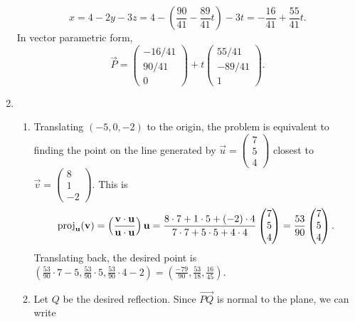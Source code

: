 \begin{enumerate}
\begin{equation*}
x = 4 - 2y - 3z =  4 - \left(\frac{90}{41} - \frac{89}{41}t\right) - 3t = -\frac{16}{41} + \frac{55}{41}t.
\end{equation*}
In vector parametric form,
\begin{equation*}
\overrightarrow{P} = \begin{pmatrix} -16/41 \\ 90/41 \\ 0 \end{pmatrix} + t\begin{pmatrix} 55/41 \\ -89/41 \\ 1 \end{pmatrix}.
\end{equation*}
\newpage
\item \begin{enumerate}
\item Translating $(-5,0,-2)$ to the origin, the problem is equivalent to finding the point on the line generated by $\vec{u} = \begin{pmatrix} 7 \\ 5 \\ 4 \end{pmatrix}$ closest to $\vec{v} = \begin{pmatrix} 8 \\ 1 \\ -2 \end{pmatrix}$. This is
\begin{equation*}
\operatorname{proj}_{\mathbf{u}}(\mathbf{v}) = \left(\frac{\mathbf{v}\cdot\mathbf{u}}{\mathbf{u}\cdot\mathbf{u}}\right)\mathbf{u} = \frac{8\cdot 7 + 1\cdot 5 + (-2)\cdot 4}{7\cdot 7 + 5\cdot 5 + 4\cdot 4}\begin{pmatrix} 7 \\ 5 \\ 4 \end{pmatrix} = \frac{53}{90}\begin{pmatrix} 7 \\ 5 \\ 4 \end{pmatrix}.
\end{equation*}
Translating back, the desired point is $\displaystyle\left(\frac{53}{90}\cdot 7 - 5, \frac{53}{90}\cdot 5, \frac{53}{90}\cdot 4 - 2\right) = \left(\frac{-79}{90}, \frac{53}{18}, \frac{16}{45}\right)$.
\item Let $Q$ be the desired reflection. Since $\overrightarrow{PQ}$ is normal to the plane, we can write
\begin{equation*}

\end{equation*}
\end{enumerate}
\end{enumerate}
